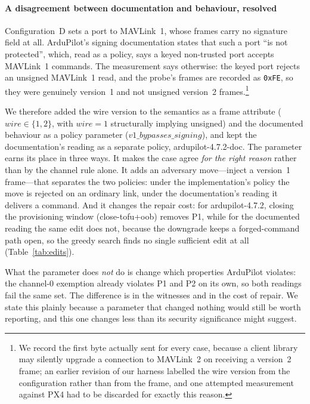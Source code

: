 \documentclass[conference]{IEEEtran}
\newcommand{\code}[1]{\texttt{#1}}
\newcommand{\prop}[1]{\textsf{#1}}
\begin{document}
\paragraph*{A disagreement between documentation and behaviour, resolved}
Configuration~D sets a port to MAVLink~1, whose frames carry no signature field
at all. ArduPilot's signing documentation states that such a port ``is not
protected'', which, read as a policy, says a keyed non-trusted port accepts
MAVLink~1 commands. The measurement says otherwise: the keyed port rejects an
unsigned MAVLink~1 read, and the probe's frames are recorded as \code{0xFE}, so
they were genuinely version~1 and not unsigned version~2 frames.\footnote{We
record the first byte actually sent for every case, because a client library may
silently upgrade a connection to MAVLink~2 on receiving a version~2 frame; an
earlier revision of our harness labelled the wire version from the
configuration rather than from the frame, and one attempted measurement against
PX4 had to be discarded for exactly this reason.}

We therefore added the wire version to the semantics as a frame attribute
($\mathit{wire}\in\{1,2\}$, with $\mathit{wire}{=}1$ structurally implying
unsigned) and the documented behaviour as a policy parameter
($\mathit{v1\_bypasses\_signing}$), and kept the documentation's reading as a
separate policy, \textsf{ardupilot-4.7.2-doc}. The parameter earns its place in
three ways. It makes the case agree \emph{for the right reason} rather than by
the channel rule alone. It adds an adversary move---inject a version~1
frame---that separates the two policies: under the implementation's policy the
move is rejected on an ordinary link, under the documentation's reading it
delivers a command. And it changes the repair cost: for
\textsf{ardupilot-4.7.2}, closing the provisioning window
(\textsf{close-tofu+oob}) removes \prop{P1}, while for the documented reading
the same edit does not, because the downgrade keeps a forged-command path open,
so the greedy search finds no single sufficient edit at all
(Table~\ref{tab:edits}).

What the parameter does \emph{not} do is change which properties ArduPilot
violates: the channel-0 exemption already violates \prop{P1} and \prop{P2} on
its own, so both readings fail the same set. The difference is in the witnesses
and in the cost of repair. We state this plainly because a parameter that
changed nothing would still be worth reporting, and this one changes less than
its security significance might suggest.
\end{document}
